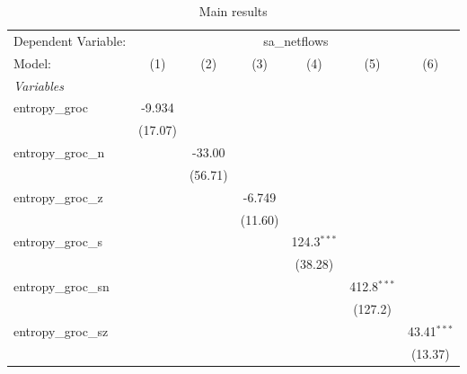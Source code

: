 
\begin{table}[htbp]
   \centering
   \footnotesize
   \begin{threeparttable}[b]
      \caption{\label{tab:reg_sa_netflows_groc.tex} Main results}
      \begin{tabular}{lcccccc}
         \tabularnewline \midrule \midrule
         Dependent Variable: & \multicolumn{6}{c}{sa\_netflows}\\
         Model:              & (1)            & (2)            & (3)            & (4)            & (5)            & (6)\\  
         \midrule
         \emph{Variables}\\
         entropy\_groc       & -9.934         &                &                &                &                &   \\   
                             & (17.07)        &                &                &                &                &   \\   
         entropy\_groc\_n    &                & -33.00         &                &                &                &   \\   
                             &                & (56.71)        &                &                &                &   \\   
         entropy\_groc\_z    &                &                & -6.749         &                &                &   \\   
                             &                &                & (11.60)        &                &                &   \\   
         entropy\_groc\_s    &                &                &                & 124.3$^{***}$  &                &   \\   
                             &                &                &                & (38.28)        &                &   \\   
         entropy\_groc\_sn   &                &                &                &                & 412.8$^{***}$  &   \\   
                             &                &                &                &                & (127.2)        &   \\   
         entropy\_groc\_sz   &                &                &                &                &                & 43.41$^{***}$\\   
                             &                &                &                &                &                & (13.37)\\   

\end{tabular}
\end{threeparttable}
\end{table}

